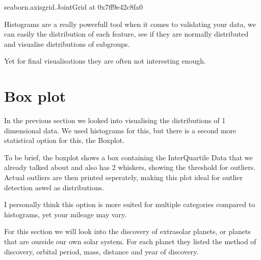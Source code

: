 \documentclass[letterpaper,10pt,english]{jupyterBook}
\begin{document}
\begin{sphinxVerbatim}[commandchars=\\\{\}]
\PYGZlt{}seaborn.axisgrid.JointGrid at 0x7ff9e42c8fa0\PYGZgt{}
\end{sphinxVerbatim}

\noindent{}

\sphinxAtStartPar
Histograms are a really powerfull tool when it comes to validating your data, we can easily the distribution of each feature, see if they are normally distributed and visualise distributions of subgroups.

\sphinxAtStartPar
Yet for final visualisations they are often not interesting enough.


\chapter{Box plot}
\label{\detokenize{c4_data_visualisation/box:box-plot}}\label{\detokenize{c4_data_visualisation/box::doc}}
\sphinxAtStartPar
In the previous section we looked into visualising the distributions of 1 dimensional data.
We used histograms for this, but there is a second more statistical option for this, the Boxplot.

\sphinxAtStartPar
To be brief, the boxplot shows a box containing the InterQuartile Data that we already talked about and also has 2 whiskers, showing the threshold for outliers.
Actual outliers are then printed seperately, making this plot ideal for outlier detection aswel as distributions.

\sphinxAtStartPar
I personally think this option is more suited for multiple categories compared to histograms, yet your mileage may vary.

\begin{sphinxVerbatim}[commandchars=\\\{\}]
   
   
\end{sphinxVerbatim}

\sphinxAtStartPar
For this section we will look into the discovery of extrasolar planets, or planets that are ourside our own solar system.
For each planet they listed the method of discovery, orbital period, mass, distance and year of discovery.
\end{document}
